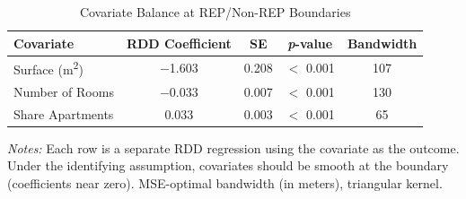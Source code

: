 \begin{table}[htbp]
\centering
\caption{Covariate Balance at REP/Non-REP Boundaries}
\label{tab:balance}
\begin{tabular}{lcccc}
\toprule
Covariate & RDD Coefficient & SE & \textit{p}-value & Bandwidth \\
\midrule
Surface (m\textsuperscript{2}) & $-$1.603 & 0.208 & $<$ 0.001 & 107 \\
Number of Rooms & $-$0.033 & 0.007 & $<$ 0.001 & 130 \\
Share Apartments & 0.033 & 0.003 & $<$ 0.001 & 65 \\
\bottomrule
\end{tabular}
\begin{tablenotes}
\small
\item \textit{Notes:} Each row is a separate RDD regression using the covariate as the outcome. Under the identifying assumption, covariates should be smooth at the boundary (coefficients near zero). MSE-optimal bandwidth (in meters), triangular kernel.
\end{tablenotes}
\end{table}
